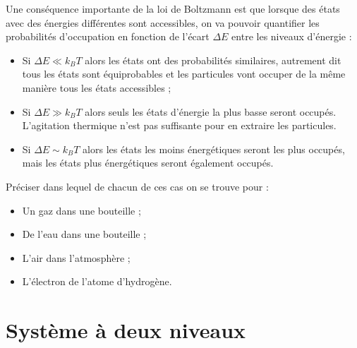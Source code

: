 \documentclass[11pt,fleqn]{book} %
\begin{document}
Une conséquence importante de la loi de Boltzmann est que lorsque des états avec des énergies différentes sont accessibles, on va pouvoir quantifier les probabilités d'occupation en fonction de l'écart $\Delta E$ entre les niveaux d'énergie :
\begin{itemize}
	\item Si $\Delta E \ll k_B T$ alors les états ont des probabilités similaires, autrement dit tous les états sont équiprobables et les particules vont occuper de la même manière tous les états accessibles ;
	\item Si $\Delta E \gg k_B T$ alors seuls les états d'énergie la plus basse seront occupés. L'agitation thermique n'est pas suffisante pour en extraire les particules.
	\item Si $\Delta E \sim k_B T$ alors les états les moins énergétiques seront les plus occupés, mais les états plus énergétiques seront également occupés.
\end{itemize}

\begin{capex}
	Préciser dans lequel de chacun de ces cas on se trouve pour :
	\begin{itemize}
		\item Un gaz dans une bouteille ;
		\item De l'eau dans une bouteille ;
		\item L'air dans l'atmosphère ;
		\item L'électron de l'atome d'hydrogène.
	\end{itemize}
\end{capex}

\section{Système à deux niveaux}
\end{document}
